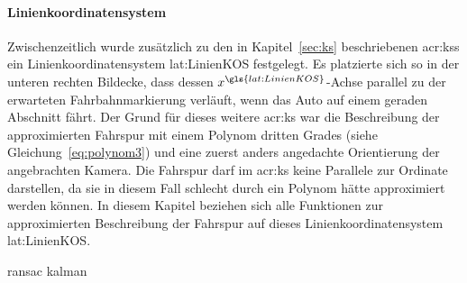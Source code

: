 \paragraph{Linienkoordinatensystem \dcfirstauthorshort}
Zwischenzeitlich wurde zusätzlich zu den in Kapitel~\ref{sec:ks} beschriebenen \glspl{acr:ks} ein Linienkoordinatensystem \gls{lat:LinienKOS} festgelegt. Es platzierte sich so in der unteren rechten Bildecke, dass dessen \( x^{\gls{lat:LinienKOS}} \)-Achse parallel zu der erwarteten Fahrbahnmarkierung verläuft, wenn das Auto auf einem geraden Abschnitt fährt. Der Grund für dieses weitere \gls{acr:ks} war die Beschreibung der approximierten Fahrspur mit einem Polynom dritten Grades (siehe Gleichung~\ref{eq:polynom3}) und eine zuerst anders angedachte Orientierung der angebrachten Kamera. Die Fahrspur darf im \gls{acr:ks} keine Parallele zur Ordinate darstellen, da sie in diesem Fall schlecht durch ein Polynom hätte approximiert werden können. In diesem Kapitel beziehen sich alle Funktionen zur approximierten Beschreibung der Fahrspur auf dieses Linienkoordinatensystem \gls{lat:LinienKOS}. 

{ransac}
{kalman}

